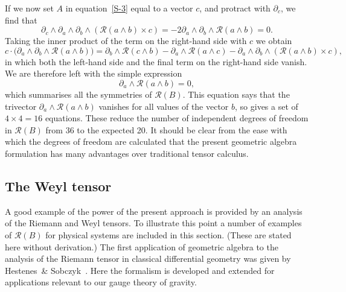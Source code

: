 \documentclass[a4paper]{article}
\numberwithin{equation}{section}
\newcommand{\dt}{\! \cdot \!}
\newcommand{\wdg}{\! \wedge \!}
\newcommand{\crs}{\! \times \!}
\newcommand{\clr}{{\mathcal{R}}}
\newcommand{\da}{\partial_a}
\newcommand{\db}{\partial_b}
\newcommand{\dc}{\partial_c}
\begin{document}
If we now set $A$ in equation~\eqref{S-3} equal to a vector $c$, and
protract with $\dc$, we find that
%
\begin{equation}
\dc \wdg \da \wdg \db \wdg (\clr(a \wdg b) \crs c) = -2 \da \wdg \db
\wdg \clr(a \wdg b) = 0.
\end{equation}
%
Taking the inner product of the term on the right-hand side with $c$
we obtain
%
\begin{equation}
c \dt \bigl( \da \wdg \db \wdg \clr(a \wdg b) \bigr) 
= \db \wdg \clr(c \wdg b) - \da \wdg \clr(a \wdg c) - 
\da \wdg \db \wdg (\clr(a \wdg b) \crs c) ,
\end{equation}
%
in which both the left-hand side and the final term on the right-hand
side vanish.  We are therefore left with the simple expression
%
\begin{equation}
\da \wdg \clr(a \wdg b) = 0,
\label{S-Rsym}
\end{equation}
%
which summarises all the symmetries of $\clr(B)$.  This equation says
that the trivector $\da\wedge\clr(a\wedge b)$ vanishes for all values
of the vector $b$, so gives a set of $4 \times 4=16$ equations.  These
reduce the number of independent degrees of freedom in $\clr(B)$ from
36 to the expected 20.  It should be clear from the ease with which
the degrees of freedom are calculated that the present geometric
algebra formulation has many advantages over traditional tensor
calculus.


\subsection{The Weyl tensor}
\label{symms-Weyl}

A good example of the power of the present approach is provided by an
analysis of the Riemann and Weyl tensors.  To illustrate this point a
number of examples of $\clr(B)$ for physical systems are included in
this section.  (These are stated here without derivation.)  The first
application of geometric algebra to the analysis of the Riemann tensor
in classical differential geometry was given by Hestenes~\&
Sobczyk~\cite{hes-gc,sob81}.  Here the formalism is developed and
extended for applications relevant to our gauge theory of gravity.
\end{document}
